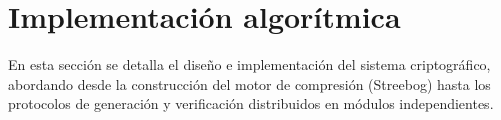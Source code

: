 \section{Implementación algorítmica}

En esta sección se detalla el diseño e implementación del sistema criptográfico, abordando desde la construcción del motor de compresión (Streebog) hasta los protocolos de generación y verificación distribuidos en módulos independientes.



